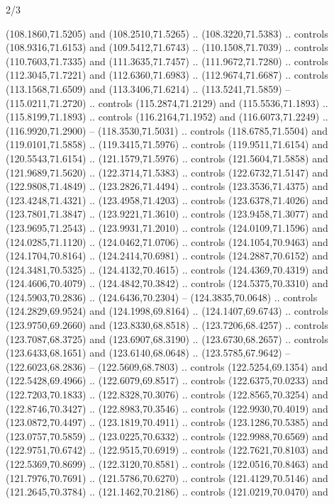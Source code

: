 \begin{flagdescription}{2/3}
\begin{scope}[shift={(0.5\flaglength,0.5)},scale=\flagwidth/320]
\begin{scope}[y=0.8pt, x=0.8pt, yscale=-1,shift={(-118.3,-146)}]
  (108.1860,71.5205) and (108.2510,71.5265) .. (108.3220,71.5383) .. controls
  (108.9316,71.6153) and (109.5412,71.6743) .. (110.1508,71.7039) .. controls
  (110.7603,71.7335) and (111.3635,71.7457) .. (111.9672,71.7280) .. controls
  (112.3045,71.7221) and (112.6360,71.6983) .. (112.9674,71.6687) .. controls
  (113.1568,71.6509) and (113.3406,71.6214) .. (113.5241,71.5859) --
  (115.0211,71.2720) .. controls (115.2874,71.2129) and (115.5536,71.1893) ..
  (115.8199,71.1893) .. controls (116.2164,71.1952) and (116.6073,71.2249) ..
  (116.9920,71.2900) -- (118.3530,71.5031) .. controls (118.6785,71.5504) and
  (119.0101,71.5858) .. (119.3415,71.5976) .. controls (119.9511,71.6154) and
  (120.5543,71.6154) .. (121.1579,71.5976) .. controls (121.5604,71.5858) and
  (121.9689,71.5620) .. (122.3714,71.5383) .. controls (122.6732,71.5147) and
  (122.9808,71.4849) .. (123.2826,71.4494) .. controls (123.3536,71.4375) and
  (123.4248,71.4321) .. (123.4958,71.4203) .. controls (123.6378,71.4026) and
  (123.7801,71.3847) .. (123.9221,71.3610) .. controls (123.9458,71.3077) and
  (123.9695,71.2543) .. (123.9931,71.2010) .. controls (124.0109,71.1596) and
  (124.0285,71.1120) .. (124.0462,71.0706) .. controls (124.1054,70.9463) and
  (124.1704,70.8164) .. (124.2414,70.6981) .. controls (124.2887,70.6152) and
  (124.3481,70.5325) .. (124.4132,70.4615) .. controls (124.4369,70.4319) and
  (124.4606,70.4079) .. (124.4842,70.3842) .. controls (124.5375,70.3310) and
  (124.5903,70.2836) .. (124.6436,70.2304) -- (124.3835,70.0648) .. controls
  (124.2829,69.9524) and (124.1998,69.8164) .. (124.1407,69.6743) .. controls
  (123.9750,69.2660) and (123.8330,68.8518) .. (123.7206,68.4257) .. controls
  (123.7087,68.3725) and (123.6907,68.3190) .. (123.6730,68.2657) .. controls
  (123.6433,68.1651) and (123.6140,68.0648) .. (123.5785,67.9642) --
  (122.6023,68.2836) -- (122.5609,68.7803) .. controls (122.5254,69.1354) and
  (122.5428,69.4966) .. (122.6079,69.8517) .. controls (122.6375,70.0233) and
  (122.7203,70.1833) .. (122.8328,70.3076) .. controls (122.8565,70.3254) and
  (122.8746,70.3427) .. (122.8983,70.3546) .. controls (122.9930,70.4019) and
  (123.0872,70.4497) .. (123.1819,70.4911) .. controls (123.1286,70.5385) and
  (123.0757,70.5859) .. (123.0225,70.6332) .. controls (122.9988,70.6569) and
  (122.9751,70.6742) .. (122.9515,70.6919) .. controls (122.7621,70.8103) and
  (122.5369,70.8699) .. (122.3120,70.8581) .. controls (122.0516,70.8463) and
  (121.7976,70.7691) .. (121.5786,70.6270) .. controls (121.4129,70.5146) and
  (121.2645,70.3784) .. (121.1462,70.2186) .. controls (121.0219,70.0470) and

\end{scope}
\end{scope}
\end{flagdescription}
